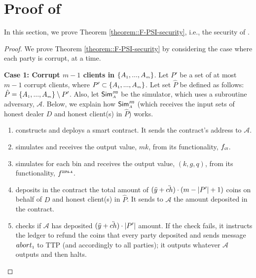 

\section{Proof of \fpsi}\label{sec::F-PSI-proof}



In this section, we prove Theorem \ref{theorem::F-PSI-security}, i.e., the security of \fpsi. 


\begin{proof}
%
We prove Theorem  \ref{theorem::F-PSI-security} by considering the case where each party is corrupt, at a time.

\noindent\textbf{Case 1: Corrupt $m-1$ clients in $\{  {  A}_{ \scriptscriptstyle {   1}}, ...,   {  A}_{ \scriptscriptstyle {   m}}\}$}.  Let $P'$ be a set of at most $m-1$ corrupt clients, where $P'\subset \{  {  A}_{ \scriptscriptstyle {   1}}, ...,   {  A}_{ \scriptscriptstyle {   m}}\}$. Let set $\hat P$ be defined as follows: $\hat P=\{  {  A}_{ \scriptscriptstyle {   1}}, ...,   {  A}_{ \scriptscriptstyle {   m}}\}\setminus P'$. Also, let $\mathsf{Sim}^{\scriptscriptstyle\mathtt{JUS}}_{\scriptscriptstyle A}$ be the simulator, which uses a subroutine adversary, $\mathcal{A}$.  Below, we explain how $\mathsf{Sim}^{\scriptscriptstyle \mathtt{JUS}}_{\scriptscriptstyle A}$ (which receives the input sets of honest dealer $D$ and honest client(s) in $\hat P$) works. 


\begin{enumerate}
%
\item constructs and deploys a smart contract. It sends the contract's address to $\mathcal{A}$. 
%
\item simulates \ct and receives the output value, $ {mk}$, from its functionality, $f_{\scriptscriptstyle \mathtt{CT}}$.
%
\item\label{sim::ZSPA-A-invocation} simulates \zspaa for each bin and receives the output value, $( k,  g,  q)$, from its functionality, $f^{\scriptscriptstyle \mathtt{ZSPA\text{-}A}}$.
%
\item deposits in the contract the total amount of $(\ddot{y}+\ddot{ch})\cdot (m-|P'|+1)$ coins on behalf of $D$ and honest client(s) in $\hat P$. It sends to $\mathcal{A}$ the amount deposited in the contract. 
%
\item checks if $\mathcal{A}$ has deposited $(\ddot{y}+\ddot{ch})\cdot |P'|$ amount. If the check fails, it instructs the ledger to refund the coins that every party deposited and sends message $abort_{\scriptscriptstyle 1}$ to TTP (and accordingly to all parties); it outputs whatever $\mathcal{A}$ outputs and then halts. 


\end{enumerate}
\end{proof}
